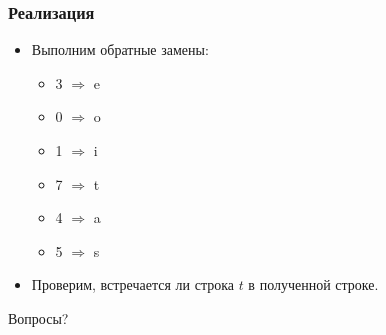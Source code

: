 \begin{frame}
    \frametitle{Реализация}

    \begin{itemize}
        \item Выполним обратные замены:
        \begin{itemize}
            \item 3 $\Rightarrow$ e
            \item 0 $\Rightarrow$ o
            \item 1 $\Rightarrow$ i
            \item 7 $\Rightarrow$ t
            \item 4 $\Rightarrow$ a
            \item 5 $\Rightarrow$ s
        \end{itemize}
        \item Проверим, встречается ли строка $t$ в полученной строке.
    \end{itemize}
\end{frame}

\begin{frame}
    \begin{center}
        \Huge Вопросы?
    \end{center}
\end{frame}

